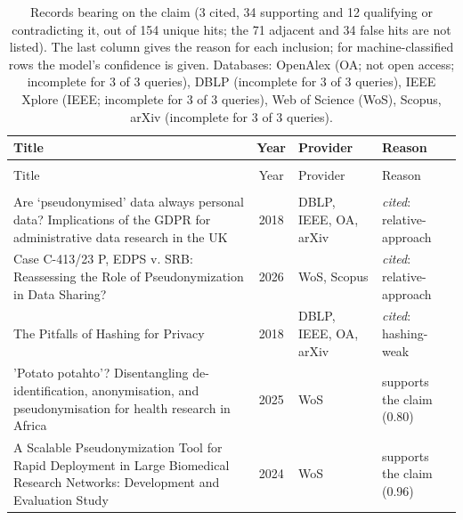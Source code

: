 
\begingroup\footnotesize
\begin{longtable}{@{}%
  >{\raggedright\arraybackslash}p{}c%
  >{\raggedright\arraybackslash}p{}%
  >{\raggedright\arraybackslash}p{}@{}}
\caption{Records bearing on the claim (3 cited, 34 supporting and 12 qualifying or contradicting it, out of 154 unique hits; the 71 adjacent and 34 false hits are not listed). The last column gives the reason for each inclusion; for machine-classified rows the model's confidence is given. Databases: OpenAlex (OA; not open access; incomplete for 3 of 3 queries), DBLP (incomplete for 3 of 3 queries), IEEE Xplore (IEEE; incomplete for 3 of 3 queries), Web of Science (WoS), Scopus, arXiv (incomplete for 3 of 3 queries).}\label{tab:t-pseudonymisation}\\
\toprule
Title & Year & Provider & Reason \\
\midrule
\endfirsthead
\multicolumn{4}{@{}l}{\emph{\tablename~\thetable{} (cont.)}}\\
\toprule
Title & Year & Provider & Reason \\
\midrule
\endhead
\midrule \multicolumn{4}{r@{}}{\emph{continued on next page}}\\
\endfoot
\bottomrule
\endlastfoot
Are `pseudonymised' data always personal data? Implications of the GDPR for administrative data research in the UK & 2018 & DBLP, IEEE, OA, arXiv & \emph{cited}: relative-approach \\
Case C-413/23 P, EDPS v. SRB: Reassessing the Role of Pseudonymization in Data Sharing? & 2026 & WoS, Scopus & \emph{cited}: relative-approach \\
The Pitfalls of Hashing for Privacy & 2018 & DBLP, IEEE, OA, arXiv & \emph{cited}: hashing-weak \\
'Potato potahto'? Disentangling de-identification, anonymisation, and pseudonymisation for health research in Africa & 2025 & WoS & supports the claim (0.80) \\
A Scalable Pseudonymization Tool for Rapid Deployment in Large Biomedical Research Networks: Development and Evaluation Study & 2024 & WoS & supports the claim (0.96) \\

\end{longtable}
